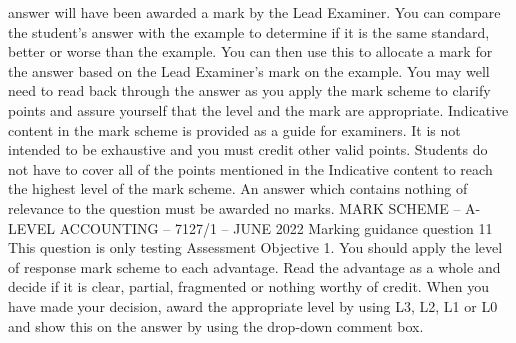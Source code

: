 \documentclass{article}
\begin{document}
answer will have been awarded a mark by the Lead Examiner.  You can compare the student’s answer \newline
with the example to determine if it is the same standard, better or worse than the example.  You can then \newline
use this to allocate a mark for the answer based on the Lead Examiner’s mark on the example. \newline
 \newline
You may well need to read back through the answer as you apply the mark scheme to clarify points and \newline
assure yourself that the level and the mark are appropriate. \newline
 \newline
Indicative content in the mark scheme is provided as a guide for examiners.  It is not intended to be \newline
exhaustive and you must credit other valid points.  Students do not have to cover all of the points \newline
mentioned in the Indicative content to reach the highest level of the mark scheme. \newline
 \newline
An answer which contains nothing of relevance to the question must be awarded no marks. \newline
 \newline
 \newline
 \newline
MARK SCHEME – A-LEVEL ACCOUNTING – 7127/1 – JUNE 2022  \newline
Marking guidance question 11 \newline
 \newline
This question is only testing Assessment Objective 1. \newline
 \newline
You should apply the level of response mark scheme to each advantage.  \newline
 \newline
Read the advantage as a whole and decide if it is clear, partial, fragmented or nothing worthy of credit. \newline
 \newline
When you have made your decision, award the appropriate level by using L3, L2, L1 or L0 and show this \newline
on the answer by using the drop-down comment box.   \newline
\end{document}
